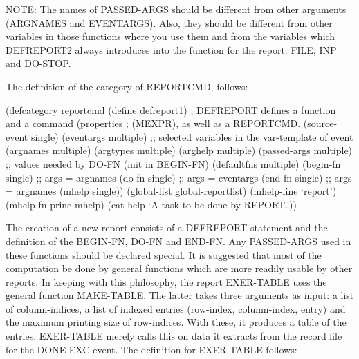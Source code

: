 NOTE: The names of PASSED-ARGS should be different from
other arguments (ARGNAMES and EVENTARGS). Also, they should
be different from other variables in those functions where
you use them and from the variables which DEFREPORT2 always
introduces into the function for the report: FILE, INP and DO-STOP.

The definition of the category of REPORTCMD, follows:

\begin{tpsexample}

(defcategory reportcmd
  (define defreport1)	      ; DEFREPORT defines a function and a command
  (properties                 ; (MEXPR), as well as a REPORTCMD.
   (source-event single)
   (eventargs multiple)   ;; selected variables in the var-template of event
   (argnames multiple)
   (argtypes multiple)
   (arghelp multiple)
   (passed-args multiple) ;; values needed by DO-FN (init in BEGIN-FN)
   (defaultfns multiple)
   (begin-fn single)    ;; args = argnames
   (do-fn single)       ;; args = eventargs
   (end-fn single)      ;; args = argnames
   (mhelp single))
  (global-list global-reportlist)
  (mhelp-line `report')
  (mhelp-fn princ-mhelp)
  (cat-help `A task to be done by REPORT.'))

\end{tpsexample}

	The creation of a new report consists of a DEFREPORT statement
and the definition of the BEGIN-FN, DO-FN and END-FN. Any PASSED-ARGS
used in these functions should be declared special. It is suggested
that most of the computation be done by general functions which are more
readily usable by other reports. In keeping with this philosophy,
the report EXER-TABLE uses the general function MAKE-TABLE. The latter
takes three arguments as input:  a list of column-indices, a list of
indexed entries (row-index, column-index, entry) and the maximum printing size
of row-indices. With these, it produces a table of the entries.
EXER-TABLE merely calls this on data it extracts from the record file
for the DONE-EXC event. The definition for EXER-TABLE follows:

